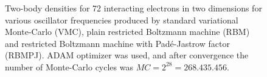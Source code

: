 \begin{landscape}
\begin{figure} [H]
		
		\caption{Two-body densities for 72 interacting electrons in two dimensions for various oscillator frequencies produced by standard variational Monte-Carlo (VMC), plain restricted Boltzmann machine (RBM) and restricted Boltzmann machine with Padé-Jastrow factor (RBMPJ). ADAM optimizer was used, and after convergence the number of Monte-Carlo cycles was $MC=2^{28}=268.435.456$.}%
		\label{fig:TB_interaction_3D_2}
	\end{figure}
\end{landscape}